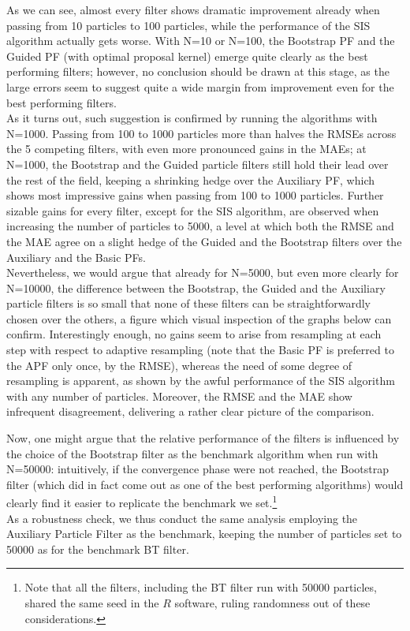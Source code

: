 \documentclass[
]{book}
\theoremstyle{break}
\theoremstyle{nonumberplain}
\begin{document}
As we can see, almost every filter shows dramatic improvement already
when passing from 10 particles to 100 particles, while the performance
of the SIS algorithm actually gets worse. With N=10 or N=100, the
Bootstrap PF and the Guided PF (with optimal proposal kernel) emerge
quite clearly as the best performing filters; however, no conclusion
should be drawn at this stage, as the large errors seem to suggest quite
a wide margin from improvement even for the best performing filters.\\
As it turns out, such suggestion is confirmed by running the algorithms
with N=1000. Passing from 100 to 1000 particles more than halves the
RMSEs across the 5 competing filters, with even more pronounced gains in
the MAEs; at N=1000, the Bootstrap and the Guided particle filters still
hold their lead over the rest of the field, keeping a shrinking hedge
over the Auxiliary PF, which shows most impressive gains when passing
from 100 to 1000 particles. Further sizable gains for every filter,
except for the SIS algorithm, are observed when increasing the number of
particles to 5000, a level at which both the RMSE and the MAE agree on a
slight hedge of the Guided and the Bootstrap filters over the Auxiliary
and the Basic PFs.\\
Nevertheless, we would argue that already for N=5000, but even more
clearly for N=10000, the difference between the Bootstrap, the Guided
and the Auxiliary particle filters is so small that none of these
filters can be straightforwardly chosen over the others, a figure which
visual inspection of the graphs below can confirm. Interestingly enough,
no gains seem to arise from resampling at each step with respect to
adaptive resampling (note that the Basic PF is preferred to the APF only
once, by the RMSE), whereas the need of some degree of resampling is
apparent, as shown by the awful performance of the SIS algorithm with
any number of particles. Moreover, the RMSE and the MAE show infrequent
disagreement, delivering a rather clear picture of the comparison.

Now, one might argue that the relative performance of the filters is
influenced by the choice of the Bootstrap filter as the benchmark
algorithm when run with N=50000: intuitively, if the convergence phase
were not reached, the Bootstrap filter (which did in fact come out as
one of the best performing algorithms) would clearly find it easier to
replicate the benchmark we
set.\footnote{Note that all the filters, including the BT filter run with 50000 particles, shared the same seed in the $R$ software, ruling randomness out of these considerations.}\\
As a robustness check, we thus conduct the same analysis employing the
Auxiliary Particle Filter as the benchmark, keeping the number of
particles set to 50000 as for the benchmark BT filter.
\end{document}
